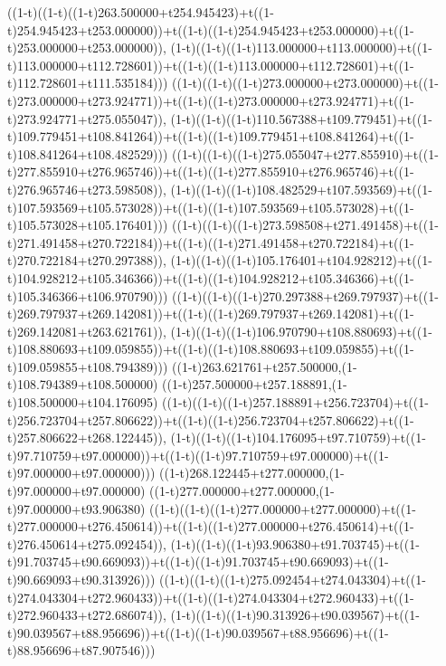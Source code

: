 ((1-t)((1-t)((1-t)263.500000+t254.945423)+t((1-t)254.945423+t253.000000))+t((1-t)((1-t)254.945423+t253.000000)+t((1-t)253.000000+t253.000000)),                                     (1-t)((1-t)((1-t)113.000000+t113.000000)+t((1-t)113.000000+t112.728601))+t((1-t)((1-t)113.000000+t112.728601)+t((1-t)112.728601+t111.535184)))
((1-t)((1-t)((1-t)273.000000+t273.000000)+t((1-t)273.000000+t273.924771))+t((1-t)((1-t)273.000000+t273.924771)+t((1-t)273.924771+t275.055047)),                                     (1-t)((1-t)((1-t)110.567388+t109.779451)+t((1-t)109.779451+t108.841264))+t((1-t)((1-t)109.779451+t108.841264)+t((1-t)108.841264+t108.482529)))
((1-t)((1-t)((1-t)275.055047+t277.855910)+t((1-t)277.855910+t276.965746))+t((1-t)((1-t)277.855910+t276.965746)+t((1-t)276.965746+t273.598508)),                                     (1-t)((1-t)((1-t)108.482529+t107.593569)+t((1-t)107.593569+t105.573028))+t((1-t)((1-t)107.593569+t105.573028)+t((1-t)105.573028+t105.176401)))
((1-t)((1-t)((1-t)273.598508+t271.491458)+t((1-t)271.491458+t270.722184))+t((1-t)((1-t)271.491458+t270.722184)+t((1-t)270.722184+t270.297388)),                                     (1-t)((1-t)((1-t)105.176401+t104.928212)+t((1-t)104.928212+t105.346366))+t((1-t)((1-t)104.928212+t105.346366)+t((1-t)105.346366+t106.970790)))
((1-t)((1-t)((1-t)270.297388+t269.797937)+t((1-t)269.797937+t269.142081))+t((1-t)((1-t)269.797937+t269.142081)+t((1-t)269.142081+t263.621761)),                                     (1-t)((1-t)((1-t)106.970790+t108.880693)+t((1-t)108.880693+t109.059855))+t((1-t)((1-t)108.880693+t109.059855)+t((1-t)109.059855+t108.794389)))
((1-t)263.621761+t257.500000,(1-t)108.794389+t108.500000)
((1-t)257.500000+t257.188891,(1-t)108.500000+t104.176095)
((1-t)((1-t)((1-t)257.188891+t256.723704)+t((1-t)256.723704+t257.806622))+t((1-t)((1-t)256.723704+t257.806622)+t((1-t)257.806622+t268.122445)),                                     (1-t)((1-t)((1-t)104.176095+t97.710759)+t((1-t)97.710759+t97.000000))+t((1-t)((1-t)97.710759+t97.000000)+t((1-t)97.000000+t97.000000)))
((1-t)268.122445+t277.000000,(1-t)97.000000+t97.000000)
((1-t)277.000000+t277.000000,(1-t)97.000000+t93.906380)
((1-t)((1-t)((1-t)277.000000+t277.000000)+t((1-t)277.000000+t276.450614))+t((1-t)((1-t)277.000000+t276.450614)+t((1-t)276.450614+t275.092454)),                                     (1-t)((1-t)((1-t)93.906380+t91.703745)+t((1-t)91.703745+t90.669093))+t((1-t)((1-t)91.703745+t90.669093)+t((1-t)90.669093+t90.313926)))
((1-t)((1-t)((1-t)275.092454+t274.043304)+t((1-t)274.043304+t272.960433))+t((1-t)((1-t)274.043304+t272.960433)+t((1-t)272.960433+t272.686074)),                                     (1-t)((1-t)((1-t)90.313926+t90.039567)+t((1-t)90.039567+t88.956696))+t((1-t)((1-t)90.039567+t88.956696)+t((1-t)88.956696+t87.907546)))
